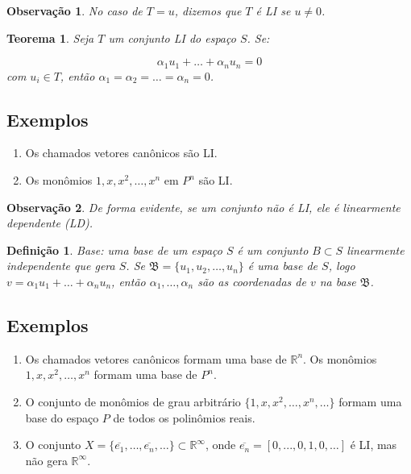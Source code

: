 \documentclass[a4paper,portuguese,9pt]{extarticle}
\newtheorem{theorem}{Teorema}[section]
\newtheorem*{definition}{Definição}
\newtheorem*{remark}{Observação}
\begin{document}
\begin{multicols*}{2}
\begin{remark}
No caso de $T= {u}$, dizemos que $T$ é LI se $u \ne 0$.
\end{remark}

\begin{theorem}
Seja $T$ um conjunto LI do espaço $S$. Se:

\begin{displaymath}
\alpha_1 u_1 + \ldots + \alpha_n u_n = 0
\end{displaymath} com $u_i \in T$, então $\alpha_1 = \alpha_2 = \ldots = \alpha_n = 0$. 

\end{theorem}

\subsection{Exemplos}\begin{enumerate}
    \item Os chamados vetores canônicos são LI.
    \item Os monômios $1, x, x^2, \ldots, x^n$ em $P^n$ são LI.
\end{enumerate}

\begin{remark}
De forma evidente, se um conjunto não é LI, ele é linearmente dependente (LD).
\end{remark}

\begin{definition}
Base: uma base de um espaço $S$ é um conjunto $B \subset S$ linearmente independente que gera $S$. Se $\mathfrak{B} = \{u_1, u_2, \ldots, u_n\}$ é uma base de $S$, logo 
$v=\alpha_1 u_1 + \ldots + \alpha_n u_n$, então $\alpha_1, \ldots, \alpha_n$ são as coordenadas de $v$ na base $\mathfrak{B}$.
\end{definition}

\subsection{Exemplos}

\begin{enumerate}
    \item Os chamados vetores canônicos formam uma base de $\mathbb{R}^n$. Os monômios $1, x, x^2, \ldots, x^n$ formam uma base de $P^n$.
    \item O conjunto de monômios de grau arbitrário $\{1, x, x^2, \ldots, x^n, \ldots\}$ formam uma base do espaço  $P$ de todos os polinômios reais.
    \item O conjunto $X=\{\overline{e_1}, \ldots, \overline{e_n}, \ldots\} \subset \mathbb{R^{\infty}}$, onde $\overline{e_n}=[0,...,0,1,0,\ldots]$  é LI, mas não gera $\mathbb{R^{\infty}}$.
\end{enumerate}


\end{multicols*}
\end{document}
